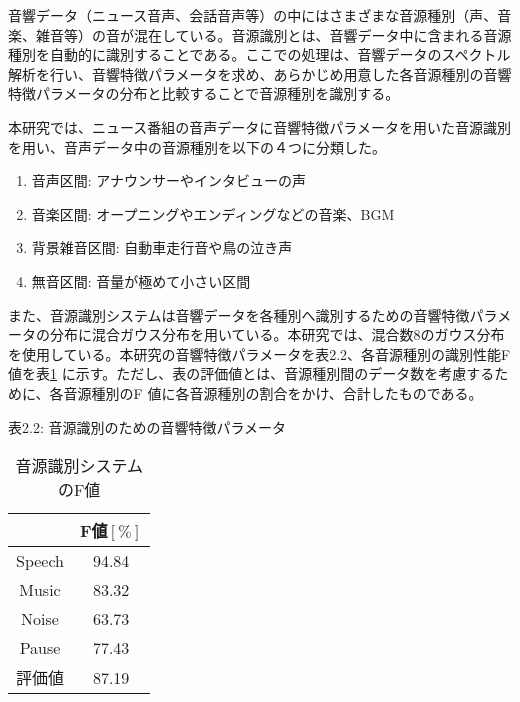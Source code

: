 \renewcommand{\labelenumi}{(\arabic{enumi})}
音響データ（ニュース音声、会話音声等）の中にはさまざまな音源種別（声、音楽、雑音等）の音が混在している。音源識別とは、音響データ中に含まれる音源種別を自動的に識別することである。ここでの処理は、音響データのスペクトル解析を行い、音響特徴パラメータを求め、あらかじめ用意した各音源種別の音響特徴パラメータの分布と比較することで音源種別を識別する。\par
本研究では、ニュース番組の音声データに音響特徴パラメータを用いた音源識別\cite{shimae_9} を用い、音声データ中の音源種別を以下の４つに分類した。

\begin{enumerate}
\item 音声区間: アナウンサーやインタビューの声
\item 音楽区間: オープニングやエンディングなどの音楽、BGM
\item 背景雑音区間: 自動車走行音や鳥の泣き声
\item 無音区間: 音量が極めて小さい区間
\end{enumerate}\par

また、音源識別システムは音響データを各種別へ識別するための音響特徴パラメータの分布に混合ガウス分布を用いている。本研究では、混合数8のガウス分布を使用している。本研究の音響特徴パラメータを表2.2、各音源種別の識別性能F 値を表\ref{ad_F} に示す。ただし、表の評価値とは、音源種別間のデータ数を考慮するために、各音源種別のF 値に各音源種別の割合をかけ、合計したものである。\par

表2.2: 音源識別のための音響特徴パラメータ

\begin{table}[htb]
  \begin{center}
    \caption{音源識別システムのF値}
    \label{ad_F}
    \begin{tabular}{|c||c|} \hline
       & F値$[\%]$\\ \hline
      Speech & 94.84  \\ \hline
      Music & 83.32 \\ \hline
      Noise & 63.73  \\ \hline
      Pause & 77.43 \\ \hline
      評価値 & 87.19 \\ \hline
    \end{tabular}
  \end{center}
\end{table}



